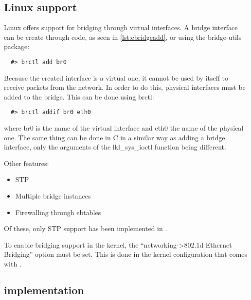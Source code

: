 \subsection{Linux support}
\label{sub-sec:switch-lin}

Linux offers support for bridging through virtual interfaces.
A bridge interface can be create through code, as seen in 
\ref{lst:cbridgeadd}, or using the bridge-utils package:
\lstset{language=zsh,caption=Adding a bridge interface,label=lst:sbridgeadd}
\begin{lstlisting}
  #> brctl add br0
\end{lstlisting}
Because the created interface is a virtual one, it cannot be
used by itself to receive packets from the network. In order 
to do this, physical interfaces must be added to the bridge. This 
can be done using brctl:
\lstset{language=zsh,caption=Adding a bridge interface,label=lst:sportadd}
\begin{lstlisting}
  #> brctl addif br0 eth0
\end{lstlisting}
where br0 is the name of the virtual interface and eth0 the 
name of the physical one. The same thing can be done in C in a similar
way as adding a bridge interface, only the arguments of the lkl_sys_ioctl
function being different.

Other features:
\begin{itemize}
  \item STP
  \item Multiple bridge instances
  \item Firewalling through ebtables
\end{itemize}
Of these, only STP support has been implemented in \textbf{\project}.

To enable bridging support in the kernel, the ``networking->802.1d Ethernet Bridging'' option
must be set. This is done in the kernel configuration that comes with \textbf{\project}.

\subsection{\text{\project} implementation}
\label{sub-sec:switch-lkl}

